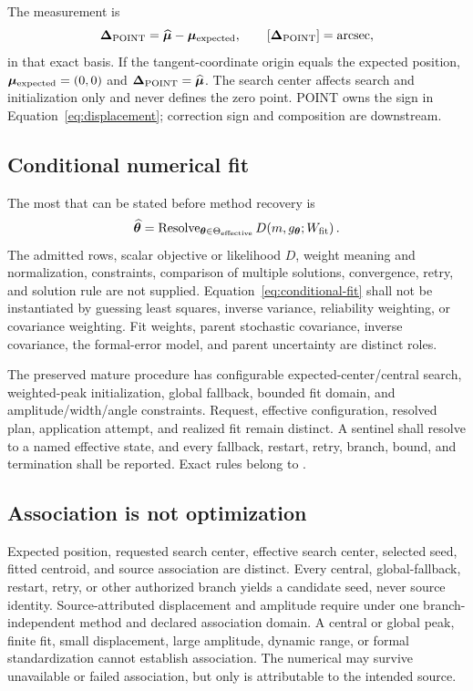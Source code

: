 The measurement is
\begin{equation}
\boldsymbol{\Delta}_{\mathrm{POINT}}=\widehat{\boldsymbol{\mu}}-\boldsymbol{\mu}_{\mathrm{expected}},
\qquad [\boldsymbol{\Delta}_{\mathrm{POINT}}]=\mathrm{arcsec},
\label{eq:displacement}
\end{equation}
in that exact basis. If the tangent-coordinate origin equals the expected
position, $\boldsymbol{\mu}_{\mathrm{expected}}=(0,0)$ and $\boldsymbol{\Delta}_{\mathrm{POINT}}=\widehat{\boldsymbol{\mu}}$. The search center affects
search and initialization only and never defines the zero point. POINT owns
the sign in Equation~\ref{eq:displacement}; correction sign and composition
are downstream.

\subsection{Conditional numerical fit}\label{sec:conditional-fit}

The most that can be stated before method recovery is
\begin{equation}
\widehat{\boldsymbol{\theta}}=
\operatorname{Resolve}_{\boldsymbol{\theta}\in\Theta_{\mathrm{effective}}}
D\!\left(m,g_{\boldsymbol{\theta}};W_{\mathrm{fit}}\right).
\label{eq:conditional-fit}
\end{equation}
The admitted rows, scalar objective or likelihood $D$, weight meaning and
normalization, constraints, comparison of multiple solutions, convergence,
retry, and solution rule are not supplied. Equation~\ref{eq:conditional-fit}
shall not be instantiated by guessing least squares, inverse variance,
reliability weighting, or covariance weighting. Fit weights, parent
stochastic covariance, inverse covariance, the formal-error model, and parent
uncertainty are distinct roles.

The preserved mature procedure has configurable expected-center/central
search, weighted-peak initialization, global fallback, bounded fit domain,
and amplitude/width/angle constraints. Request, effective configuration,
resolved plan, application attempt, and realized fit remain distinct. A
sentinel shall resolve to a named effective state, and every fallback,
restart, retry, branch, bound, and termination shall be reported. Exact rules
belong to \CompatMethod{}.

\subsection{Association is not optimization}\label{sec:association}

Expected position, requested search center, effective search center, selected
seed, fitted centroid, and source association are distinct. Every central,
global-fallback, restart, retry, or other authorized branch yields a candidate
seed, never source identity. Source-attributed displacement and amplitude
require  under one
branch-independent method and declared association domain. A central or
global peak, finite fit, small displacement, large amplitude, dynamic range,
or formal standardization cannot establish association. The numerical
 may survive unavailable or failed
association, but only
 is attributable to the
intended source.

